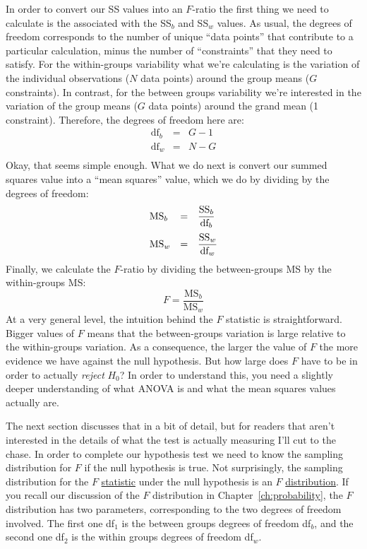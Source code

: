 In order to convert our SS values into an $F$-ratio the first thing we need to calculate is the  associated with the SS$_b$ and SS$_w$ values. As usual, the degrees of freedom corresponds to the number of unique ``data points'' that contribute to a particular calculation, minus the number of ``constraints'' that they need to satisfy. For the within-groups variability what we're calculating is the variation of the individual observations ($N$ data points) around the group means ($G$ constraints). In contrast, for the between groups variability we're interested in the variation of the group means ($G$ data points) around the grand mean (1 constraint). Therefore, the degrees of freedom here are:
$$
\begin{array}{lcl}
\mbox{df}_b &=& G-1 \\
\mbox{df}_w &=& N-G \\
\end{array}
$$
Okay, that seems simple enough. What we do next is convert our summed squares value into a ``mean squares'' value, which we do by dividing by the degrees of freedom: 
$$
\begin{array}{lcl}
\mbox{MS}_b &=& \displaystyle\frac{\mbox{SS}_b }{ \mbox{df}_b} \vspace*{6pt} \\
\mbox{MS}_w &=& \displaystyle\frac{\mbox{SS}_w }{ \mbox{df}_w} 
\end{array}
$$
Finally, we calculate the $F$-ratio by dividing the between-groups MS by the within-groups MS:
$$
F = \frac{\mbox{MS}_b }{ \mbox{MS}_w } 
$$
At a very general level, the intuition behind the $F$ statistic is straightforward. Bigger values of $F$ means that the between-groups variation is large relative to the within-groups variation. As a consequence, the larger the value of $F$ the more evidence we have against the null hypothesis. But how large does $F$ have to be in order to actually {\it reject} $H_0$? In order to understand this, you need a slightly deeper understanding of what ANOVA is and what the mean squares values actually are. 

The next section discusses that in a bit of detail, but for readers that aren't interested in the details of what the test is actually measuring I'll cut to the chase. In order to complete our hypothesis test we need to know the sampling distribution for $F$ if the null hypothesis is true. Not surprisingly, the sampling distribution for the $F$ \underline{statistic} under the null hypothesis is an $F$ \underline{distribution}. If you recall our discussion of the $F$ distribution in Chapter~\ref{ch:probability}, the $F$ distribution has two parameters, corresponding to the two degrees of freedom involved. The first one df$_1$ is the between groups degrees of freedom df$_b$, and the second one df$_2$ is the within groups degrees of freedom df$_w$. 

